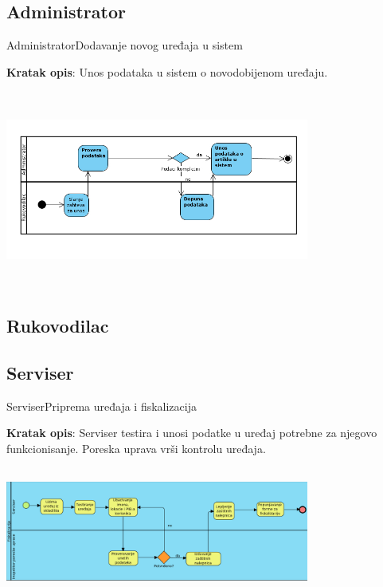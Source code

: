 \documentclass[9pt]{beamer}
\begin{document}
\subsection{Administrator}
\begin{frame}{Administrator}{Dodavanje novog uređaja u sistem}
    \begin{center}
    \small{
    \textbf{Kratak opis}: Unos podataka u sistem o novodobijenom uređaju.}
    \end{center}
    \begin{center}
        \includegraphics[width=10cm, height=6.5cm]{assets/dijagramSaradnje.jpg}
    \end{center}
\end{frame}
\subsection{Rukovodilac}
\subsection{Serviser}
\begin{frame}{Serviser}{Priprema uređaja i fiskalizacija}
    \begin{center}
    \small{\textbf{Kratak opis}: Serviser testira i unosi podatke u uređaj potrebne za njegovo funkcionisanje. Poreska uprava vrši kontrolu uređaja.}
    \end{center}
    \begin{center}
        \includegraphics[width=10cm, height=4.2cm]{assets/bpmnFiskalizacija.png}
    \end{center}
\end{frame}
\end{document}
